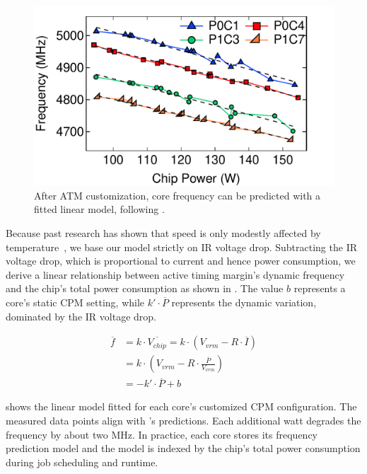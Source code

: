 \begin{figure}[t]
  \centering
      \includegraphics[trim=0 0 0 0,clip,width=.75\linewidth]{graphs/process/freq-pred.pdf}
      \captionsetup{width=.9\linewidth}
      \caption{After ATM customization, core frequency can be predicted with a fitted linear model, following .}
\label{fig:freq-pred}
\end{figure}

Because past research has shown that speed is only modestly affected by temperature~\cite{zu2016tistate}, we base our model strictly on IR voltage drop. Subtracting the IR voltage drop, which is proportional to current and hence power consumption, we derive a linear relationship between active timing margin's dynamic frequency and the chip's total power consumption as shown in  . The value $b$ represents a core's static CPM setting, while $k' \cdot \overline{P}$ represents the dynamic variation, dominated by the IR voltage drop. 

\begin{equation}\label{eq:freq-pred}
\begin{split}
\overline{f} &= k \cdot \overline{V_{chip}} = k \cdot (V_{vrm} - R \cdot \overline{I})\\
&= k \cdot (V_{vrm} - R \cdot \frac{\overline{P}}{V_{vrm}})\\
&= -k' \cdot \overline{P} + b
\end{split}
\end{equation}

 shows the linear model fitted for each core's customized CPM configuration. The measured data points align with 's predictions. Each additional watt degrades the frequency by about two MHz. In practice, each core stores its frequency prediction model and the model is indexed by the chip's total power consumption during job scheduling and runtime.

